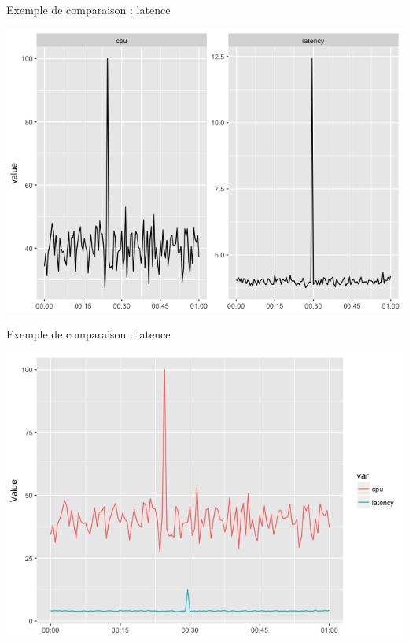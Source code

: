 \documentclass[french]{beamer}
\begin{document}
\begin{frame}{Exemple de comparaison : latence}
\begin{center}
	\includegraphics[width=\textwidth]{latency}
\end{center}
\end{frame}

\begin{frame}{Exemple de comparaison : latence}
\begin{center}
	\includegraphics[width=\textwidth]{latency2}
\end{center}
\end{frame}
\end{document}
